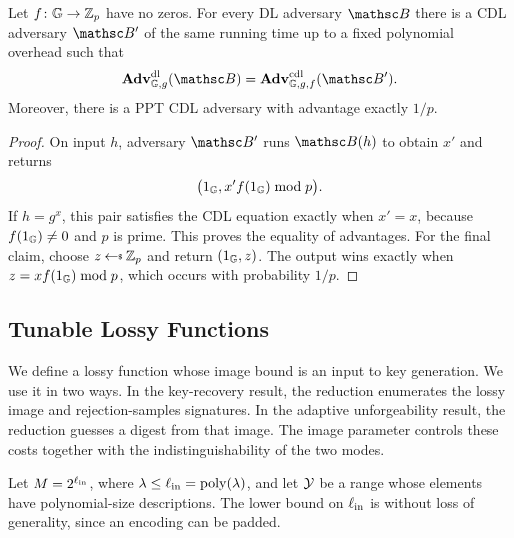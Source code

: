 \begin{lemma} \label{lem-dl-cdl}
Let $f\colon\mathbb{G}\to\mathbb Z_p$ have no zeros. For every DL adversary $\advB$ there is a CDL adversary $\advB'$ of the same running time up to a fixed polynomial overhead such that
$$
\AdvDL{\GG,g}{\advB}=\AdvCDL{\GG,g,f}{\advB'}.
$$
Moreover, there is a PPT CDL adversary with advantage exactly $1/p$.
\end{lemma}

\begin{proof}
On input $h$, adversary $\advB'$ runs $\advB(h)$ to obtain $x'$ and returns
$$
\bigl(1_{\mathbb{G}},x'f(1_{\mathbb{G}})\bmod p\bigr).
$$
If $h=g^x$, this pair satisfies the CDL equation exactly when $x'=x$, because $f(1_{\mathbb{G}})\ne0$ and $p$ is prime. This proves the equality of advantages. For the final claim, choose $z\getsr\Zp$ and return $(1_{\mathbb{G}},z)$. The output wins exactly when $z=xf(1_{\mathbb{G}})\bmod p$, which occurs with probability $1/p$.
\end{proof}

\subsection{Tunable Lossy Functions} \label{sec-lf}

We define a lossy function whose image bound is an input to key generation. We use it in two ways. In the key-recovery result, the reduction enumerates the lossy image and rejection-samples signatures. In the adaptive unforgeability result, the reduction guesses a digest from that image. The image parameter controls these costs together with the indistinguishability of the two modes.

Let $M=2^{\ell_{\mathrm{in}}}$, where $\lambda\le\ell_{\mathrm{in}}=\mathop{\rm poly}\nolimits(\lambda)$, and let $\mathcal{Y}$ be a range whose elements have polynomial-size descriptions. The lower bound on $\ell_{\mathrm{in}}$ is without loss of generality, since an encoding can be padded.

